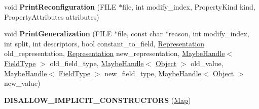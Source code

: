 \begin{DoxyCompactItemize}
\item 
void {\bfseries Print\+Reconfiguration} (F\+I\+LE $\ast$file, int modify\+\_\+index, Property\+Kind kind, Property\+Attributes attributes)\hypertarget{classv8_1_1internal_1_1_map_a03845e5498d8cbb877f4eb3fd5f3b29f}{}\label{classv8_1_1internal_1_1_map_a03845e5498d8cbb877f4eb3fd5f3b29f}

\item 
void {\bfseries Print\+Generalization} (F\+I\+LE $\ast$file, const char $\ast$reason, int modify\+\_\+index, int split, int descriptors, bool constant\+\_\+to\+\_\+field, \hyperlink{classv8_1_1internal_1_1_representation}{Representation} old\+\_\+representation, \hyperlink{classv8_1_1internal_1_1_representation}{Representation} new\+\_\+representation, \hyperlink{classv8_1_1internal_1_1_maybe_handle}{Maybe\+Handle}$<$ \hyperlink{classv8_1_1internal_1_1_field_type}{Field\+Type} $>$ old\+\_\+field\+\_\+type, \hyperlink{classv8_1_1internal_1_1_maybe_handle}{Maybe\+Handle}$<$ \hyperlink{classv8_1_1internal_1_1_object}{Object} $>$ old\+\_\+value, \hyperlink{classv8_1_1internal_1_1_maybe_handle}{Maybe\+Handle}$<$ \hyperlink{classv8_1_1internal_1_1_field_type}{Field\+Type} $>$ new\+\_\+field\+\_\+type, \hyperlink{classv8_1_1internal_1_1_maybe_handle}{Maybe\+Handle}$<$ \hyperlink{classv8_1_1internal_1_1_object}{Object} $>$ new\+\_\+value)\hypertarget{classv8_1_1internal_1_1_map_aa32b3fd7606b8bb9def6e8d1771fa25b}{}\label{classv8_1_1internal_1_1_map_aa32b3fd7606b8bb9def6e8d1771fa25b}

\item 
{\bfseries D\+I\+S\+A\+L\+L\+O\+W\+\_\+\+I\+M\+P\+L\+I\+C\+I\+T\+\_\+\+C\+O\+N\+S\+T\+R\+U\+C\+T\+O\+RS} (\hyperlink{classv8_1_1internal_1_1_map}{Map})\hypertarget{classv8_1_1internal_1_1_map_ab9d86a820b1d0d800549b5f97da5b6c2}{}\label{classv8_1_1internal_1_1_map_ab9d86a820b1d0d800549b5f97da5b6c2}

\end{DoxyCompactItemize}
